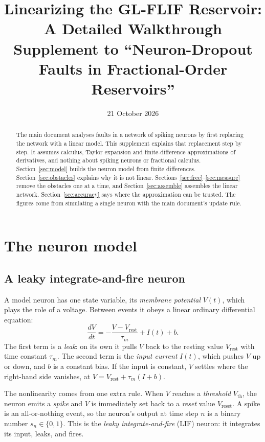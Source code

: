\documentclass[11pt,a4paper]{article}
\title{Linearizing the GL-FLIF Reservoir: A Detailed Walkthrough\\[4pt]
\large Supplement to ``Neuron-Dropout Faults in Fractional-Order Reservoirs''}
\author{}
\date{21 October 2026}
\newcommand{\Vth}{V_{\mathrm{th}}}
\newcommand{\Vrest}{V_{\mathrm{rest}}}
\newcommand{\Vreset}{V_{\mathrm{reset}}}
\begin{document}
\maketitle

\begin{abstract}
\noindent
The main document analyses faults in a network of spiking neurons by first replacing the network with a linear model. This supplement explains that replacement step by step. It assumes calculus, Taylor expansion and finite-difference approximations of derivatives, and nothing about spiking neurons or fractional calculus. Section~\ref{sec:model} builds the neuron model from finite differences. Section~\ref{sec:obstacles} explains why it is not linear. Sections~\ref{sec:free}--\ref{sec:measure} remove the obstacles one at a time, and Section~\ref{sec:assemble} assembles the linear network. Section~\ref{sec:accuracy} says where the approximation can be trusted. The figures come from simulating a single neuron with the main document's update rule.
\end{abstract}

\tableofcontents

\section{The neuron model}
\label{sec:model}

\subsection{A leaky integrate-and-fire neuron}

A model neuron has one state variable, its \emph{membrane potential} $V(t)$, which plays the role of a voltage. Between events it obeys a linear ordinary differential equation:
\begin{equation}
\frac{dV}{dt} = -\frac{V - \Vrest}{\tau_m} + I(t) + b.
\label{eq:lif-ode}
\end{equation}
The first term is a \emph{leak}: on its own it pulls $V$ back to the resting value $\Vrest$ with time constant $\tau_m$. The second term is the \emph{input current} $I(t)$, which pushes $V$ up or down, and $b$ is a constant bias. If the input is constant, $V$ settles where the right-hand side vanishes, at $V = \Vrest + \tau_m (I + b)$.

The nonlinearity comes from one extra rule. When $V$ reaches a \emph{threshold} $\Vth$, the neuron emits a \emph{spike} and $V$ is immediately set back to a \emph{reset} value $\Vreset$. A spike is an all-or-nothing event, so the neuron's output at time step $n$ is a binary number $s_n \in \{0, 1\}$. This is the \emph{leaky integrate-and-fire} (LIF) neuron: it integrates its input, leaks, and fires.
\end{document}
